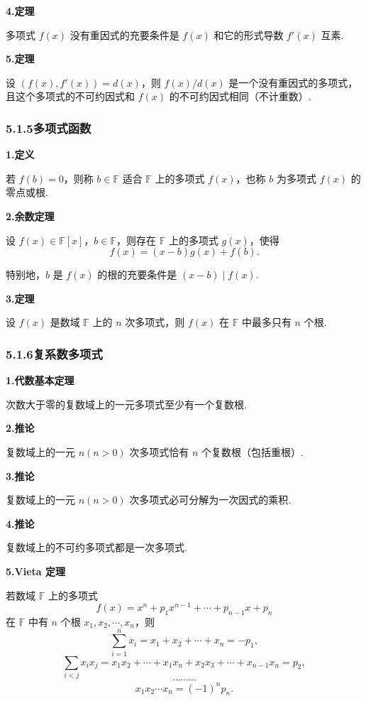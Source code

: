 \documentclass[UTF8,12pt,a4paper,fontset=fandol]{ctexart}
\begin{document}
\noindent\textbf{4.\quad 定理}

多项式 $f(x)$ 没有重因式的充要条件是 $f(x)$ 和它的形式导数 $f'(x)$ 互素.

\noindent\textbf{5.\quad 定理}

设 $(f(x),f'(x))=d(x)$，则 $f(x)/d(x)$ 是一个没有重因式的多项式，且这个多项式的不可约因式和 $f(x)$ 的不可约因式相同（不计重数）.

\subsubsection*{5.1.5\quad 多项式函数}

\noindent\textbf{1.\quad 定义}

若 $f(b)=0$，则称 $b\in\mathbb{F}$ 适合 $\mathbb{F}$ 上的多项式 $f(x)$，也称 $b$ 为多项式 $f(x)$ 的零点或根.

\noindent\textbf{2.\quad 余数定理}

设 $f(x)\in\mathbb{F}[x]$，$b\in\mathbb{F}$，则存在 $\mathbb{F}$ 上的多项式 $g(x)$，使得
\[
f(x)=(x-b)g(x)+f(b).
\]

特别地，$b$ 是 $f(x)$ 的根的充要条件是 $(x-b)\mid f(x)$.

\noindent\textbf{3.\quad 定理}

设 $f(x)$ 是数域 $\mathbb{F}$ 上的 $n$ 次多项式，则 $f(x)$ 在 $\mathbb{F}$ 中最多只有 $n$ 个根.

\subsubsection*{5.1.6\quad 复系数多项式}

\noindent\textbf{1.\quad 代数基本定理}

次数大于零的复数域上的一元多项式至少有一个复数根.

\noindent\textbf{2.\quad 推论}

复数域上的一元 $n(n>0)$ 次多项式恰有 $n$ 个复数根（包括重根）.

\noindent\textbf{3.\quad 推论}

复数域上的一元 $n(n>0)$ 次多项式必可分解为一次因式的乘积.

\noindent\textbf{4.\quad 推论}

复数域上的不可约多项式都是一次多项式.

\noindent\textbf{5.\quad Vieta 定理}

若数域 $\mathbb{F}$ 上的多项式
\[
f(x)=x^n+p_1x^{n-1}+\cdots+p_{n-1}x+p_n
\]
在 $\mathbb{F}$ 中有 $n$ 个根 $x_1,x_2,\cdots,x_n$，则
\[
\sum_{i=1}^n x_i=x_1+x_2+\cdots+x_n=-p_1,
\]
\[
\sum_{i<j}x_ix_j=x_1x_2+\cdots+x_1x_n+x_2x_3+\cdots+x_{n-1}x_n=p_2,
\]
\[
\cdots\cdots\cdots
\]
\[
x_1x_2\cdots x_n=(-1)^n p_n.
\]
\end{document}
